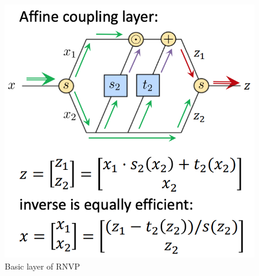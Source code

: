 \begin{frame}
\begin{columns}
        \begin{column}[t]{0.48\textwidth}
            \begin{figure}
                \includegraphics[width=\textwidth, trim={0 0 0 1.5cm}, clip]{img/RNVP-basic-layer.png}
                \caption{Basic layer of RNVP~\cite{Kothe21}}
            \end{figure} 
        \end{column}
    \end{columns}

\end{frame}